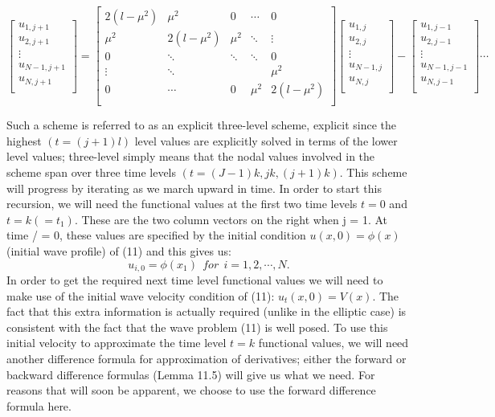 \documentclass[../main.tex]{subfiles}
\begin{document}
\begin{equation}\label{eqa25}
\left[\begin{array}{c}
u_{1,j+1}\\
u_{2,j+1}\\
\vdots\\
u_{N-1,j+1}\\
u_{N,j+1} \\
\end{array}\right]=
\left[\begin{array}{ccccc}
2(l-\mu^2)&\mu^2&0&\cdots&0\\
\mu^2&2(l-\mu^2)&\mu^2&\ddots&\vdots\\
0&\ddots&\ddots&\ddots&0\\
\vdots&\ddots& & &\mu^2\\
0&\cdots&0&\mu^2&2(l-\mu^2)\\
\end{array}\right]
\left[\begin{array}{c}
u_{1,j}\\
u_{2,j}\\
\vdots\\
u_{N-1,j}\\
u_{N,j} \\
\end{array}\right]-
\left[\begin{array}{c}
u_{1,j-1}\\
u_{2,j-1}\\
\vdots\\
u_{N-1,j-1}\\
u_{N,j-1} \\
\end{array}\right] \cdots
\end{equation}

Such a scheme is referred to as an explicit three-level scheme, explicit since the 
highest $(t = (j + 1) l) $ level values are explicitly solved in terms of the lower level 
values; three-level simply means that the nodal values involved in the scheme span 
over three time levels $(t = (J -1)k,jk, (j + 1)k)$. This scheme will progress by 
iterating as we march upward in time. In order to start this recursion, we will 
need the functional values at the first two time levels $t = 0$ and $t = k( = t_1)$. These 
are the two column vectors on the right when j = 1. At time / = 0, these values are specified by the initial condition $u(x,0) = \phi(x)$ (initial wave profile) of (11) and this gives us:
 \begin{equation}\label{eqa26}
	u_{i,0} =\phi(x_1) ~~for ~~i=1,2,\cdots,N.
\end{equation}
In order to get the required next time level functional values we will need to make 
use of the initial wave velocity condition of (11): $u_t(x,0) = V(x)$. The fact that 
this extra information is actually required (unlike in the elliptic case) is consistent with the fact that the wave problem (11) is well posed. To use this initial velocity to approximate the time level $t = k$ functional values, we will need another difference formula for approximation of derivatives; either the forward or backward difference formulas (Lemma 11.5) will give us what we need. For reasons that will soon be apparent, we choose to use the forward difference 
formula here. 
\end{document}
